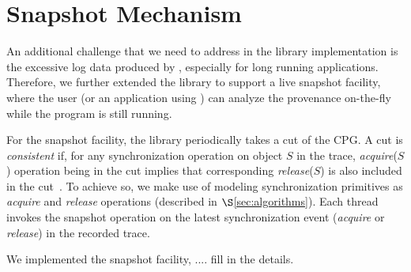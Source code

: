 \section{Snapshot Mechanism}
\label{sec:snapshot}
An additional challenge that we need to address in the library implementation is the excessive log data produced by \intelpt, especially for long running applications. Therefore, we further extended the library to support a live snapshot facility, where the user (or an application using \projecttitle) can analyze the provenance on-the-fly while the program is still running.

For the snapshot facility, the library periodically takes a cut of the CPG. A cut is {\em consistent} if, for any synchronization operation on object $S$ in the trace,  {\em acquire}($S$) operation being in the cut implies that corresponding {\em release}($S$) is also included in the cut~\cite{chandy-lamport}.  To achieve so, we make use of modeling synchronization primitives as {\em acquire} and {\em release} operations (described in $\S$\ref{sec:algorithms}). Each thread invokes the snapshot operation on the latest  synchronization event ({\em acquire} or {\em release}) in the recorded trace.



 We implemented the snapshot facility, .... fill in the details.